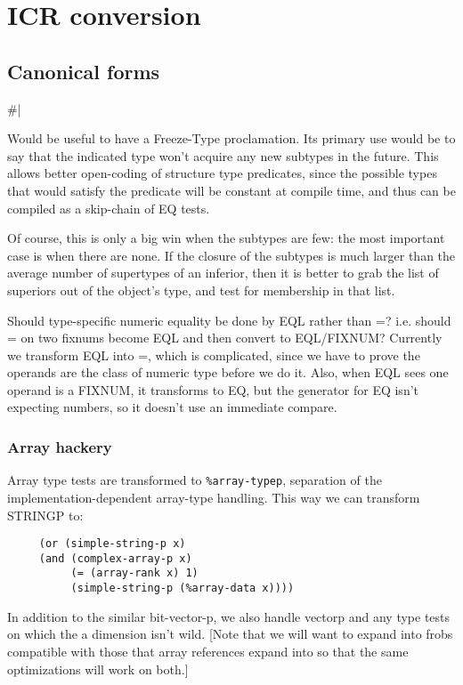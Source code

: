 \chapter{ICR conversion} %


\section{Canonical forms}

\#|

Would be useful to have a Freeze-Type proclamation.  Its primary use would be
to say that the indicated type won't acquire any new subtypes in the future.
This allows better open-coding of structure type predicates, since the possible
types that would satisfy the predicate will be constant at compile time, and
thus can be compiled as a skip-chain of EQ tests.  

Of course, this is only a big win when the subtypes are few: the most important
case is when there are none.  If the closure of the subtypes is much larger
than the average number of supertypes of an inferior, then it is better to grab
the list of superiors out of the object's type, and test for membership in that
list.

Should type-specific numeric equality be done by EQL rather than =?  i.e.
should = on two fixnums become EQL and then convert to EQL/FIXNUM?
Currently we transform EQL into =, which is complicated, since we have to prove
the operands are the class of numeric type before we do it.  Also, when EQL
sees one operand is a FIXNUM, it transforms to EQ, but the generator for EQ
isn't expecting numbers, so it doesn't use an immediate compare.


\subsection{Array hackery}

Array type tests are transformed to \verb|%array-typep|, separation of the
implementation-dependent array-type handling.  This way we can transform
STRINGP to:

\begin{verbatim}
     (or (simple-string-p x)
	 (and (complex-array-p x)
	      (= (array-rank x) 1)
	      (simple-string-p (%array-data x))))  
\end{verbatim}

In addition to the similar bit-vector-p, we also handle vectorp and any type
tests on which the a dimension isn't wild.
[Note that we will want to expand into frobs compatible with those that
array references expand into so that the same optimizations will work on both.]


